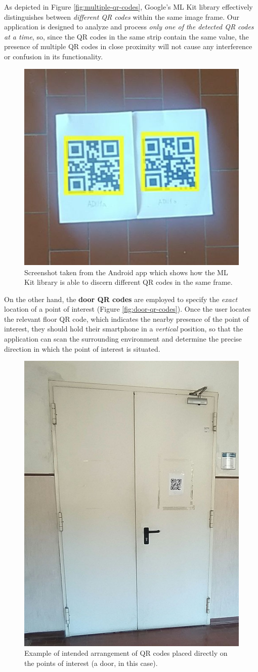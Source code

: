 As depicted in Figure \vref{fig:multiple-qr-codes}, Google's ML Kit library effectively distinguishes between \textit{different QR codes} within the same image frame. 
Our application is designed to analyze and process \textit{only one of the detected QR codes at a time}, so, since the QR codes in the same strip contain the same value, the presence of multiple QR codes in close proximity will not cause any interference or confusion in its functionality.


\begin{figure}[H]
    \centering
    \includegraphics[width=0.6\columnwidth]{chapters/architecture/images/multiple-qr-codes.jpg}
    \caption{Screenshot taken from the Android app which shows how the ML Kit library is able to discern different QR codes in the same frame.}
    \label{fig:multiple-qr-codes}
\end{figure}


On the other hand, the \textbf{door QR codes} are employed to specify the \textit{exact} location of a point of interest (Figure \vref{fig:door-qr-codes}). Once the user locates the relevant floor QR code, which indicates the nearby presence of the point of interest, they should hold their smartphone in a \textit{vertical} position, so that the application can scan the surrounding environment and determine the precise direction in which the point of interest is situated.


\begin{figure}[H]
    \centering
    \includegraphics[width=0.6\columnwidth]{chapters/architecture/images/door-qr-codes.jpg}
    \caption{Example of intended arrangement of QR codes placed directly on the points of interest (a door, in this case).}
    \label{fig:door-qr-codes}
\end{figure}
